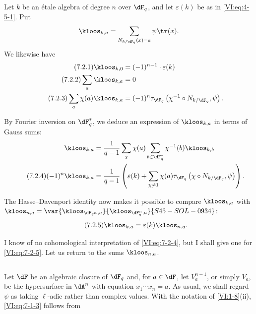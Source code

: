 \subsection{}\label{VI:7-2}

Let $k$ be an étale algebra of degree $n$ over $\dF_q$, and let $\varepsilon(k)$ 
be as in \eqref{VI:eq:4-5-1}. Put 
\[
  \kloos_{k,a} = \sum_{N_{k/\dF_q}(x)=a} \psi \tr(x) \text{.} 
\]
We likewise have 
\begin{align*}\tag{7.2.1}\label{VI:eq:7-2-1}
  \kloos_{k,0} &= (-1)^{n-1} \cdot \varepsilon(k) \\ \tag{7.2.2}\label{VI:eq:7-2-2}
  \sum_a \kloos_{k,a} &= 0 \\ \tag{7.2.3}\label{VI:eq:7-2-3}
  \sum_a \chi(a) \kloos_{k,a} &= (-1)^n \tau_{\dF_q}\left(\chi^{-1}\circ N_{k/\dF_q},\psi\right) \text{.} 
\end{align*}

By Fourier inversion on $\dF_q^\ast$, we deduce an expression of 
$\kloos_{k,a}$ in terms of Gauss sums: 
\begin{align*} 
  \kloos_{k,a} &= \frac{1}{q-1} \sum_\chi \chi(a) \sum_{b\in \dF_q^\ast} \chi^{-1}(b) \kloos_{k,b} \\ \tag{7.2.4}\label{VI:eq:7-2-4}
  (-1)^n \kloos_{k,a} &= \frac{1}{q-1} \left(\varepsilon(k) + \sum_{\chi\ne 1} \chi(a) \tau_{\dF_q}\left(\chi\circ N_{k/\dF_q},\psi\right) \right) \text{.} 
\end{align*}

The Hasse--Davenport identity now makes it possible to compare $\kloos_{k,a}$ 
with $\kloos_{n,a} = \var{\kloos_{\dF_{q^n},a}}{\kloos_{\dF_q^n,a}}{S45-SOL-0934}$: 
\begin{equation*}\tag{7.2.5}\label{VI:eq:7-2-5}
  \kloos_{k,a} = \varepsilon(k) \kloos_{n,a} \text{.} 
\end{equation*}

I know of no cohomological interpretation of \eqref{VI:eq:7-2-4}, but 
I shall give one for \eqref{VI:eq:7-2-5}. Let us return to the sums $\kloos_{n,a}$. 





\subsection{}\label{VI:7-3}

Let $\dF$ be an algebraic closure of $\dF_q$ and, for $a\in \dF$, let 
$V_a^{n-1}$, or simply $V_a$, be the hypersurface in $\dA^n$ with equation 
$x_1 \dotsm x_n=a$. As usual, we shall regard $\psi$ as taking 
$\ell$-adic rather than complex values. With the notation of 
\ref{VI:1-8}(ii), \eqref{VI:eq:7-1-3} follows from 





